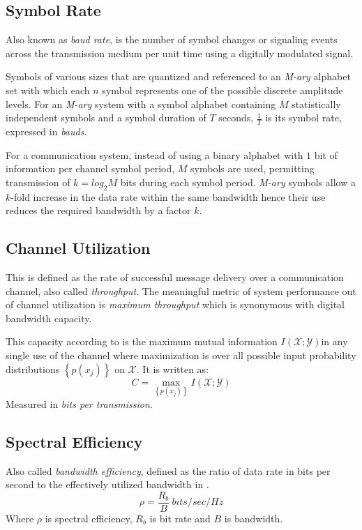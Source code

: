 \subsection{Symbol Rate}
Also known as \textit{baud rate}, is the number of symbol changes or signaling events across the transmission medium per unit time using a digitally modulated signal.

Symbols of various sizes that are quantized and referenced to an \textit{M-ary} alphabet set with which each $n$ \gls{symbol} represents one of the possible discrete amplitude levels. For an \textit{M-ary} system with a \gls{symbol} alphabet containing $M$ statistically independent \gls{symbol}s and a \gls{symbol} duration of $T$ seconds, $\frac{1}{T}$ is its \gls{symbol} rate, expressed in \textit{bauds}\cite{hayk}.

For a communication system, instead of using a binary alphabet with $1$ bit of information per channel \gls{symbol} period, $M$ \gls{symbol}s are used, permitting transmission of $k=log_{2}M$ bits during each \gls{symbol} period. \textit{M-ary} \gls{symbol}s allow a $k$-fold increase in the data rate within the same bandwidth hence their use reduces the required bandwidth by a factor $k$\cite{AWGN}.

\subsection{Channel Utilization}
This is defined as the rate of successful message delivery over a communication channel, also called \textit{throughput}.
The meaningful metric of system performance out of channel utilization is \textit{maximum throughput} which is synonymous with digital bandwidth capacity.

This capacity according to \cite{hayk} is the maximum mutual information $I\left( \mathscr{X;Y} \right)$in any single use of the channel where maximization is over all possible input probability distributions $\left\{ p\left( x_j\right) \right\}$ on $\mathscr{X}$. It is written as: 
$$C = \underset{\left\{ p\left( x_j\right) \right\}}{\max} I\left( \mathscr{X;Y} \right)$$
Measured in \textit{bits per transmission}.

\subsection{Spectral Efficiency}
Also called \textit{bandwidth efficiency}, defined as the ratio of data rate in bits per second to the effectively utilized bandwidth in \cite{hayk}.
$$\rho = \frac{R_b}{B}\ bits/sec/Hz$$
Where $\rho$ is spectral efficiency, $R_b$ is bit rate and $B$ is bandwidth.

